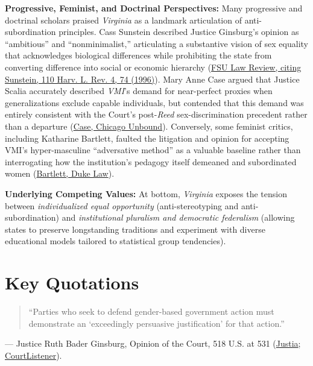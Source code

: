 \documentclass[12pt]{article}
\begin{document}
\textbf{Progressive, Feminist, and Doctrinal Perspectives:} Many progressive and doctrinal scholars praised \textit{Virginia} as a landmark articulation of anti-subordination principles. Cass Sunstein described Justice Ginsburg's opinion as ``ambitious'' and ``nonminimalist,'' articulating a substantive vision of sex equality that acknowledges biological differences while prohibiting the state from converting difference into social or economic hierarchy (\href{https://ir.law.fsu.edu/cgi/viewcontent.cgi?article=1533&context=articles}{FSU Law Review, citing Sunstein, 110 Harv. L. Rev. 4, 74 (1996)}). Mary Anne Case argued that Justice Scalia accurately described \textit{VMI}'s demand for near-perfect proxies when generalizations exclude capable individuals, but contended that this demand was entirely consistent with the Court's post-\textit{Reed} sex-discrimination precedent rather than a departure (\href{https://chicagounbound.uchicago.edu/cgi/viewcontent.cgi?article=2109&context=journal_articles}{Case, Chicago Unbound}). Conversely, some feminist critics, including Katharine Bartlett, faulted the litigation and opinion for accepting VMI's hyper-masculine ``adversative method'' as a valuable baseline rather than interrogating how the institution's pedagogy itself demeaned and subordinated women (\href{https://scholarship.law.duke.edu/cgi/viewcontent.cgi?article=2936&context=faculty_scholarship}{Bartlett, Duke Law}).

\textbf{Underlying Competing Values:} At bottom, \textit{Virginia} exposes the tension between \textit{individualized equal opportunity} (anti-stereotyping and anti-subordination) and \textit{institutional pluralism and democratic federalism} (allowing states to preserve longstanding traditions and experiment with diverse educational models tailored to statistical group tendencies).

\section{Key Quotations}
\begin{quote}
``Parties who seek to defend gender-based government action must demonstrate an `exceedingly persuasive justification' for that action.''
\end{quote}
\noindent --- Justice Ruth Bader Ginsburg, Opinion of the Court, 518 U.S. at 531 (\href{https://supreme.justia.com/cases/federal/us/518/515/}{Justia}; \href{https://www.courtlistener.com/opinion/118056/united-states-v-virginia/}{CourtListener}).
\end{document}
